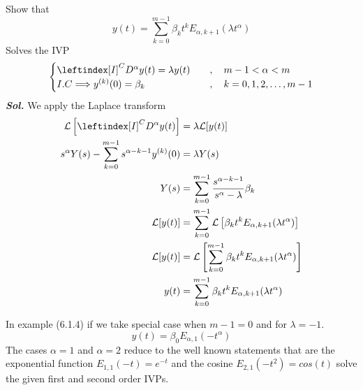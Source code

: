 \begin{example}
    Show that 
    \[
        y(t) = \sum_{k=0}^{m-1} \beta_k t^{k} E_{\alpha,k+1}(\lambda t^\alpha)
    \]
    Solves the IVP 
    \[
        \begin{cases}
            \leftindex[I]^C {D^{\alpha}} y(t) = \lambda y(t)    \quad&,\quad m-1<\alpha<m
            \\
            I.C \Longrightarrow y^{(k)}(0) = \beta_k \quad&,\quad k = 0,1,2,\dots,m-1
        \end{cases}
    \]
    \textit{ \textbf{Sol.} } We apply the Laplace transform
        \begin{align*}
            \mathcal{L}\left[\leftindex[I]^C {D^{\alpha}} y(t)\right] &= \lambda \mathcal{L}[y(t)]
            \\
            s^{\alpha} Y(s) - \sum_{k=0}^{m-1} s^{\alpha-k-1} y^{(k)}(0) &= \lambda Y(s)
            \\
            Y(s) &= \sum_{k=0}^{m-1} \frac{s^{\alpha-k-1}}{s^{\alpha}-\lambda} \beta_k
            \\
            \mathcal{L}[y(t)] &= \sum_{k=0}^{m-1} \mathcal{L}\left[\beta_k t^{k} E_{\alpha,k+1}(\lambda t^\alpha)\right]
            \\
            \mathcal{L}[y(t)] &= \mathcal{L}\left[\sum_{k=0}^{m-1} \beta_k t^{k} E_{\alpha,k+1}(\lambda t^\alpha)\right]
            \\
            y(t) &= \sum_{k=0}^{m-1} \beta_k t^{k} E_{\alpha,k+1}(\lambda t^\alpha)
        \end{align*}
\end{example}
In example (6.1.4) if we take special case when $m-1 = 0$ and for $\lambda = -1$. 
\[
    y(t) = \beta_0 E_{\alpha,1}(-t^\alpha)
\]
The cases $\alpha = 1$ and $\alpha = 2$
reduce to the well known statements that are the exponential function $E_{1,1}(-t) = e^{-t}$ and
the cosine $E_{2,1}(-t^2) = cos(t)$ solve the given first and second order IVPs.

